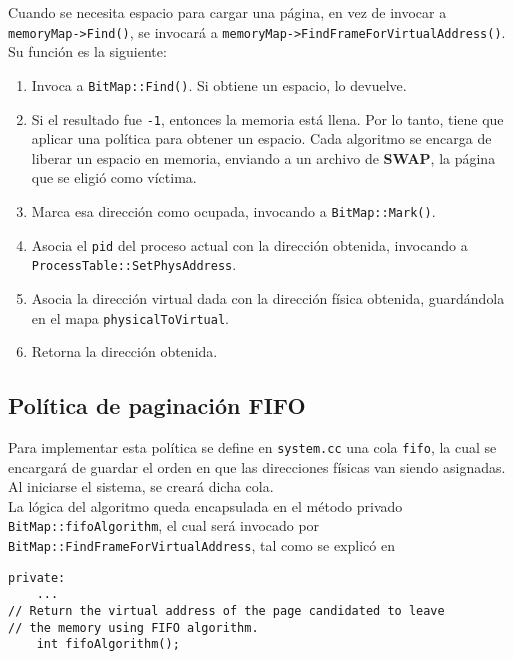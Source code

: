 Cuando se necesita espacio para cargar una página, en vez de invocar a \texttt{memoryMap->Find()}, se invocará a \texttt{memoryMap->FindFrameForVirtualAddress()}. Su función es la siguiente:
\begin{enumerate}
    \item Invoca a \texttt{BitMap::Find()}. Si obtiene un espacio, lo devuelve.
    \item Si el resultado fue \texttt{-{}1}, entonces la memoria está llena. Por lo tanto, tiene que aplicar una política para obtener un espacio. Cada algoritmo se encarga de liberar un espacio en memoria, enviando a un archivo de \textbf{SWAP}, la página que se eligió como víctima.
    \item Marca esa dirección como ocupada, invocando a \texttt{BitMap::Mark()}.
    \item Asocia el \texttt{pid} del proceso actual con la dirección obtenida, invocando a\\ \texttt{ProcessTable::SetPhysAddress}.
    \item Asocia la dirección virtual dada con la dirección física obtenida, guardándola en el mapa \texttt{physicalToVirtual}.
    \item Retorna la dirección obtenida.
\end{enumerate}
\subsection*{Política de paginación FIFO}
Para implementar esta política se define en \texttt{system.cc} una cola \texttt{fifo}, la cual se encargará de guardar el orden en que las direcciones físicas van siendo asignadas. Al iniciarse el sistema, se creará dicha cola.\\
La lógica del algoritmo queda encapsulada en el método privado \texttt{BitMap::fifoAlgorithm}, el cual será invocado por \texttt{BitMap::FindFrameForVirtualAddress}, tal como se explicó en 
\begin{lstlisting}[style=C]
  private:
    ...
// Return the virtual address of the page candidated to leave
// the memory using FIFO algorithm.
    int fifoAlgorithm();
\end{lstlisting}

